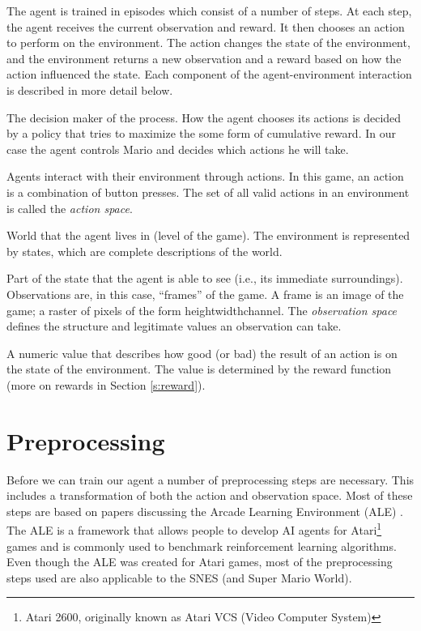 \documentclass[a4paper]{article}
\begin{document}
The agent is trained in episodes which consist of a number of steps.
At each step, the agent receives the current observation and reward.
It then chooses an action to perform on the environment.
The action changes the state of the environment, and the environment returns a new observation and a reward based on how the action influenced the state.
Each component of the agent-environment interaction is described in more detail below.
\begin{description}[leftmargin=0cm]
    \item[Agent.]
    The decision maker of the process.
    How the agent chooses its actions is decided by a policy that tries to maximize the some form of cumulative reward.
    In our case the agent controls Mario and decides which actions he will take.
    \item[Action.]
    Agents interact with their environment through actions.
    In this game, an action is a combination of button presses.
    The set of all valid actions in an environment is called the \emph{action space}.
    \item[Environment.]
    World that the agent lives in (level of the game).
    The environment is represented by states, which are complete descriptions of the world.
    \item[Observation.]
    Part of the state that the agent is able to see (i.e., its immediate surroundings).
    Observations are, in this case, ``frames'' of the game.
    A frame is an image of the game; a raster of pixels of the form height\texttimes{}width\texttimes{}channel.
    The \emph{observation space} defines the structure and legitimate values an observation can take.
    \item[Reward.]
    A numeric value that describes how good (or bad) the result of an action is on the state of the environment.
    The value is determined by the reward function (more on rewards in Section \ref{s:reward}).
\end{description}

\section{Preprocessing} \label{s:preprocessing}
Before we can train our agent a number of preprocessing steps are necessary.
This includes a transformation of both the action and observation space.
Most of these steps are based on papers discussing the Arcade Learning Environment (ALE) \cite{bellemare2013arcade,machado2018revisiting}.
The ALE is a framework that allows people to develop AI agents for Atari\footnote{Atari 2600, originally known as Atari VCS (Video Computer System)} games and is commonly used to benchmark reinforcement learning algorithms.
Even though the ALE was created for Atari games, most of the preprocessing steps used are also applicable to the SNES (and Super Mario World).
\end{document}
